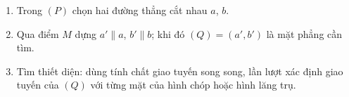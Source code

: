\begin{enumerate}
\item Trong $(P)$ chọn hai đường thẳng cắt nhau $a$, $b$.
\item Qua điểm $M$ dựng $a'\parallel a$, $b'\parallel b$; khi đó $(Q)=(a',b')$ là mặt phẳng cần tìm.
\item Tìm thiết diện: dùng tính chất giao tuyến song song, lần lượt xác định giao tuyến của $(Q)$ với từng mặt của hình chóp hoặc hình lăng trụ.
\end{enumerate}
